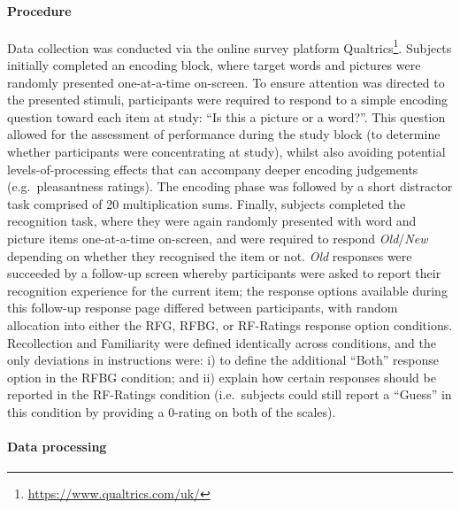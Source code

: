 \documentclass[
  11pt,
]{article}
\begin{document}
\hypertarget{procedure}{%
\paragraph{Procedure}\label{procedure}}

\hfill\break Data collection was conducted via the online survey
platform Qualtrics\footnote{\url{https://www.qualtrics.com/uk/}}.
Subjects initially completed an encoding block, where target words and
pictures were randomly presented one-at-a-time on-screen. To ensure
attention was directed to the presented stimuli, participants were
required to respond to a simple encoding question toward each item at
study: ``Is this a picture or a word?''. This question allowed for the
assessment of performance during the study block (to determine whether
participants were concentrating at study), whilst also avoiding
potential levels-of-processing effects that can accompany deeper
encoding judgements (e.g.~pleasantness ratings). The encoding phase was
followed by a short distractor task comprised of 20 multiplication sums.
Finally, subjects completed the recognition task, where they were again
randomly presented with word and picture items one-at-a-time on-screen,
and were required to respond \emph{Old}/\emph{New} depending on whether
they recognised the item or not. \emph{Old} responses were succeeded by
a follow-up screen whereby participants were asked to report their
recognition experience for the current item; the response options
available during this follow-up response page differed between
participants, with random allocation into either the RFG, RFBG, or
RF-Ratings response option conditions. Recollection and Familiarity were
defined identically across conditions, and the only deviations in
instructions were: i) to define the additional ``Both'' response option
in the RFBG condition; and ii) explain how certain responses should be
reported in the RF-Ratings condition (i.e.~subjects could still report a
``Guess'' in this condition by providing a 0-rating on both of the
scales).

\hypertarget{data-processing}{%
\paragraph{Data processing}\label{data-processing}}
\end{document}

